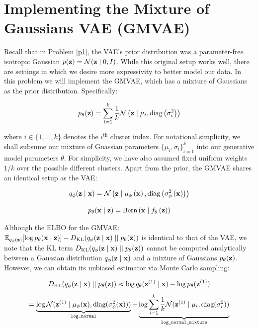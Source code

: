 \section{Implementing the Mixture of Gaussians VAE (GMVAE)}

Recall that in Problem \ref{p1}, the VAE’s prior distribution was a parameter-free isotropic Gaussian $p(\mathbf{z}) = \mathcal{N}(\mathbf{z} \mid 0,I)$. 
While this original setup works well, there are settings in which we desire more expressivity to better model our data. In this 
problem we will implement the GMVAE, which has a mixture of Gaussians as the prior distribution. Specifically:

\begin{equation} \label{eq:7}
    p_{\theta}(\mathbf{z}) = \sum\limits_{i=1}^{k} \frac{1}{k} \mathcal{N}\left(\mathbf{z} \mid \mu_i, \text{diag}\left(\sigma_i^2\right)\right)
\end{equation}

where $i \in \{1,...,k\}$ denotes the $i^{\text{th}}$ cluster index. For notational simplicity, we shall subsume our mixture of 
Guassian parameters ${\{\mu_i, \sigma_i\}}_{i=1}^{k}$ into our generative model parameters $\theta$. For simplicity, we have also 
assumed fixed uniform weights $1/k$ over the possible different clusters. Apart from the prior, the GMVAE shares an identical setup 
as the VAE:

\begin{equation} \label{eq:8}
    q_{\phi}(\mathbf{z} \mid \mathbf{x}) = \mathcal{N}\left(\mathbf{z} \mid \mu_{\phi}\left(\mathbf{x}\right), \text{diag}\left(\sigma_{\phi}^2\left(\mathbf{x}\right)\right)\right)
\end{equation}

\begin{equation} \label{eq:9}
    p_{\theta}(\mathbf{x} \mid \mathbf{z}) = \text{Bern}\left(\mathbf{x} \mid f_{\theta}\left(\mathbf{z}\right)\right)
\end{equation}

Although the ELBO for the GMVAE: $\mathbb{E}_{q_{\phi}(\mathbf{z})}[\log p_{\theta}(\mathbf{x} \mid \mathbf{z})] - D_{\text{KL}}(q_{\phi}(\mathbf{z} \mid \mathbf{x}) \mid\mid p_{\theta}(\mathbf{z}))$ is identical to 
that of the VAE, we note that the KL term $D_{\text{KL}}(q_{\phi}(\mathbf{z} \mid \mathbf{x}) \mid\mid p_{\theta}(\mathbf{z}))$ cannot be computed analytically 
between a Gaussian distribution $q_{\phi}(\mathbf{z} \mid \mathbf{x})$ and a mixture of Gaussians $p_{\theta}(\mathbf{z})$. However, we can obtain its 
unbiased estimator via Monte Carlo sampling:

\begin{equation} \label{eq:10}
    D_{\text{KL}}(q_{\phi}(\mathbf{z} \mid \mathbf{x}) \mid\mid p_{\theta}(\mathbf{z})) \approx \log q_{\theta}(\mathbf{z}^{(1)} \mid \mathbf{x}) - \log p_{\theta}(\mathbf{z}^{(1)})
\end{equation}
\begin{equation} \label{eq:11}
    = \underbrace{\log \mathcal{N}(\mathbf{z}^{(1)} \mid \mu_{\phi}(\mathbf{x}), \text{diag}(\sigma_{\phi}^2(\mathbf{x})))}_\text{\texttt{log\_normal}} - \underbrace{\log\sum\limits_{i=1}^{k} \frac{1}{k}\mathcal{N}(\mathbf{z}^{(1)}\mid\mu_i,\text{diag}(\sigma_i^2))}_\text{\texttt{log\_normal\_mixture}}
\end{equation}

